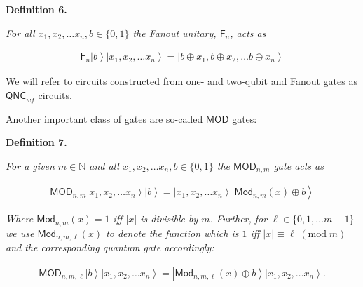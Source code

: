\documentclass[10pt,a4paper]{article}
\begin{document}


\par\medskip\noindent\textbf{
\textbf{Definition 6}\textbf{.}
}\par



\emph{For all $x_{1},x_{2},\dots x_{n},b\in\{0,1\}$ the Fanout unitary, $\mathsf{F}_{n}$, acts as}\par


\[\begin{gathered}
\displaystyle\mathsf{F}_{n}\left|b\right\rangle\left|x_{1},x_{2},\dots x_{n}\right\rangle=\left|b\oplus x_{1},b\oplus x_{2},\dots b\oplus x_{n}\right\rangle
\end{gathered}\]






We will refer to circuits constructed from one- and two-qubit and Fanout gates as ${\mathsf{QNC}}_{wf}$ circuits.\par




Another important class of gates are so-called $\mathsf{MOD}$ gates:\par





\par\medskip\noindent\textbf{
\textbf{Definition 7}\textbf{.}
}\par



\emph{For a given $m\in\mathbb{N}$ and all $x_{1},x_{2},\dots x_{n},b\in\{0,1\}$ the $\mathsf{MOD}_{n,m}$ gate acts as}\par


\[\begin{gathered}
\displaystyle\mathsf{MOD}_{n,m}\left|x_{1},x_{2},\dots x_{n}\right\rangle\left|b\right\rangle=\left|x_{1},x_{2},\dots x_{n}\right\rangle\left|{\mathsf{Mod}}_{n,m}(x)\oplus b\right\rangle
\end{gathered}\]


\emph{Where ${\mathsf{Mod}}_{n,m}(x)=1$ iff $|x|$ is divisible by $m$. Further, for $\ell\in\{0,1,\dots m-1\}$ we use ${\mathsf{Mod}}_{n,m,\ell}(x)$ to denote the function which is $1$ iff $|x|\equiv\ell\;(\mathrm{mod}\;m)$ and the corresponding quantum gate accordingly:}\par


\[\begin{gathered}
\displaystyle\mathsf{MOD}_{n,m,\ell}\left|b\right\rangle\left|x_{1},x_{2},\dots x_{n}\right\rangle=\left|{\mathsf{Mod}}_{n,m,\ell}(x)\oplus b\right\rangle\left|x_{1},x_{2},\dots x_{n}\right\rangle.
\end{gathered}\]
\end{document}
